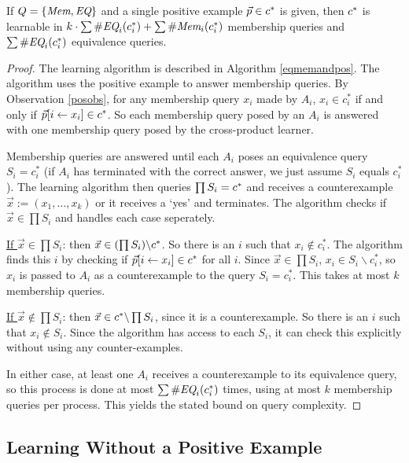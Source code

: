 \begin{proposition}
If $Q = \{\emph{Mem}, \emph{EQ}\}$ and a single positive example $\vec{p} \in c^*$ is given, then $c^*$ is learnable in $k \cdot \sum \#\emph{EQ}_{i}(c^*_i) + \sum \#\emph{Mem}_{i}(c^*_i)$ membership queries and $\sum \#\emph{EQ}_{i}(c^*_i)$ equivalence queries. 
\end{proposition}
\begin{proof}
The learning algorithm is described in Algorithm \ref{eqmemandpos}.
The algorithm uses the positive example to answer membership queries.
By Observation \ref{posobs}, for any membership query $x_i$ made by $A_i$, $x_i \in c^*_i$ if and only if $\vec{p}[i \leftarrow x_i]\in c^*$.
So each membership query posed by an $A_i$ is answered with one membership query posed by the cross-product learner. 

Membership queries are answered until each $A_i$ poses an equivalence query $S_i = c^*_i$ (if $A_i$ has terminated with the correct answer, we just assume $S_i$ equals $c^*_i$).
The learning algorithm then queries $\prod S_i = c^*$ and receives a counterexample $\vec{x} := (x_1, \dots, x_k)$ or it receives a `yes' and terminates.
The algorithm checks if $\vec{x}  \in \prod S_i$ and handles each case seperately.

\underline{If $\vec{x}  \in \prod S_i$}: then $\vec{x} \in (\prod S_i) \backslash c^*$. 
So there is an $i$ such that $x_i \not\in c^*_i$.
The algorithm finds this $i$ by checking if $\vec{p}[i \leftarrow x_i]\in c^*$ for all $i$. 
Since $\vec{x} \in \prod S_i$, $x_i \in S_i \backslash c^*_i$, so $x_i$ is passed to $A_i$ as a counterexample to the query $S_i = c^*_i$.
This takes at most $k$ membership queries.

\underline{If $\vec{x}  \not\in \prod S_i$}: then $\vec{x} \in c^* \backslash  \prod S_i$, since it is a counterexample. 
So there is an $i$ such that $x_i \not\in S_i$.
Since the algorithm has access to each $S_i$, it can check this explicitly without using any counter-examples. 

In either case, at least one $A_i$ receives a counterexample to its equivalence query, so this process is done at most $\sum \#\emph{EQ}_{i}(c^*_i)$ times, using at most $k$ membership queries per process. 
This yields the stated bound on query complexity. 
\end{proof}


\subsection{Learning Without a Positive Example}



